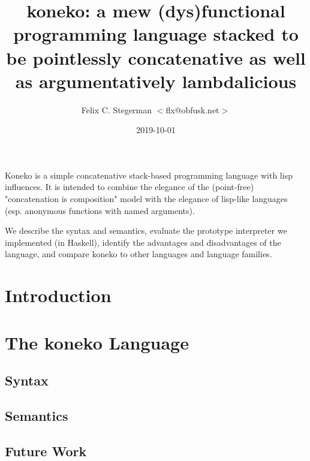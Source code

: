 \documentclass[a4paper,twocolumn]{article}
\title{
  koneko: a mew (dys)functional programming language stacked to be
  pointlessly concatenative as well as argumentatively lambdalicious
}
\author{Felix C. Stegerman $<$flx@obfusk.net$>$}
\date{2019-10-01}
\begin{document}
\maketitle

\abstract

Koneko is a simple concatenative stack-based programming language with
lisp influences.  It is intended to combine the elegance of the
(point-free) "concatenation is composition" model with the elegance of
lisp-like languages (esp. anonymous functions with named arguments).

We describe the syntax and semantics, evaluate the prototype
interpreter we implemented (in Haskell), identify the advantages and
disadvantages of the language, and compare koneko to other languages
and language families.

\section{Introduction}

%



\section{The koneko Language}

\subsection*{Syntax}

\subsection*{Semantics}

\subsection*{Future Work}
\end{document}
